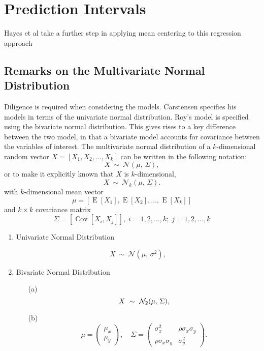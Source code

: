 \documentclass[12pt, a4paper]{article}
\theoremstyle{plain}
\theoremstyle{definition}
\theoremstyle{remark}
\begin{document}
\section{Prediction Intervals}
Hayes et al take a further step in applying mean centering to this
regression approach









\newpage
\subsection{Remarks on the Multivariate Normal Distribution}

Diligence is required when considering the models. Carstensen specifies his models in terms of the univariate normal distribution. Roy's model is specified using the bivariate normal distribution.
This gives rises to a key difference between the two model, in that a bivariate model accounts for covariance between the variables of interest.
The multivariate normal distribution of a $k$-dimensional random vector $X = [X_1, X_2, \ldots, X_k]$
can be written in the following notation:
\[
    X\ \sim\ \mathcal{N}(\mu,\, \Sigma),
\]
or to make it explicitly known that $X$ is $k$-dimensional,
\[
    X\ \sim\ \mathcal{N}_k(\mu,\, \Sigma).
\]
with $k$-dimensional mean vector
\[ \mu = [ \operatorname{E}[X_1], \operatorname{E}[X_2], \ldots, \operatorname{E}[X_k]] \]
and $k \times k$ covariance matrix
\[ \Sigma = [\operatorname{Cov}[X_i, X_j]], \; i=1,2,\ldots,k; \; j=1,2,\ldots,k \]

\bigskip

\begin{enumerate}
\item Univariate Normal Distribution

\[
    X\ \sim\ \mathcal{N}(\mu,\, \sigma^2),
\]

\item Bivariate Normal Distribution

\begin{itemize}
\item[(a)] \[  X\ \sim\ \mathcal{N}_2(\mu,\, \Sigma), \vspace{1cm}\]
\item[(b)] \[    \mu = \begin{pmatrix} \mu_x \\ \mu_y \end{pmatrix}, \quad
    \Sigma = \begin{pmatrix} \sigma_x^2 & \rho \sigma_x \sigma_y \\
                             \rho \sigma_x \sigma_y  & \sigma_y^2 \end{pmatrix}.\]
\end{itemize}
\end{enumerate}
\newpage
\end{document}
